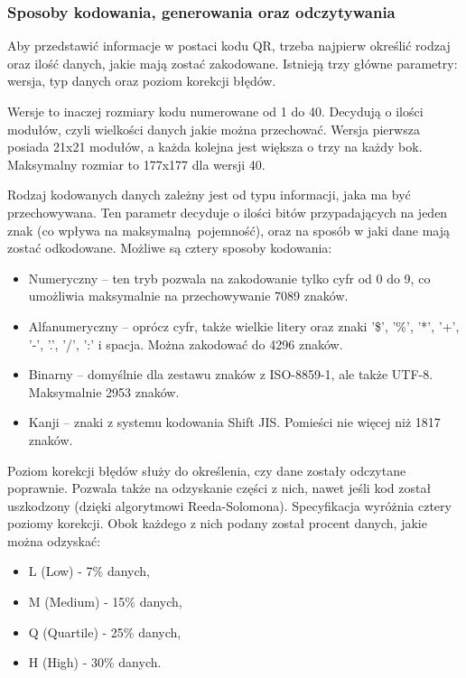 \subsubsection*{Sposoby kodowania, generowania oraz odczytywania}
Aby przedstawić informacje w postaci kodu QR, trzeba najpierw określić rodzaj oraz ilość danych, jakie mają zostać zakodowane. Istnieją trzy główne parametry: wersja, typ danych oraz poziom korekcji błędów.

Wersje to inaczej rozmiary kodu numerowane od 1 do 40. Decydują o ilości modułów, czyli wielkości danych jakie można przechować. Wersja pierwsza posiada 21x21 modułów, a każda kolejna jest większa o trzy na każdy bok. Maksymalny rozmiar to 177x177 dla wersji 40. 

Rodzaj kodowanych danych zależny jest od typu informacji, jaka ma być przechowywana. Ten parametr decyduje o ilości bitów przypadających na jeden znak (co wpływa na maksymalną pojemność), oraz na sposób w jaki dane mają zostać odkodowane. Możliwe są cztery sposoby kodowania:
\begin{itemize}
	\item Numeryczny -- ten tryb pozwala na zakodowanie tylko cyfr od 0 do 9, co umożliwia maksymalnie na przechowywanie 7089 znaków.
	\item Alfanumeryczny -- oprócz cyfr, także wielkie litery oraz znaki '\$', '\%', '*', '+', '-', '.', '/', ':' i spacja. Można zakodować do 4296 znaków. 
	\item Binarny -- domyślnie dla zestawu znaków z ISO-8859-1, ale także UTF-8. Maksymalnie 2953 znaków.
	\item Kanji -- znaki z systemu kodowania Shift JIS. Pomieści nie więcej niż 1817 znaków.
\end{itemize}

Poziom korekcji błędów służy do określenia, czy dane zostały odczytane poprawnie. Pozwala także na odzyskanie części z nich, nawet jeśli kod został uszkodzony (dzięki algorytmowi Reeda-Solomona). Specyfikacja wyróżnia cztery poziomy korekcji. Obok każdego z nich podany został procent danych, jakie można odzyskać:
\begin{itemize}
	\item L (Low) - 7\% danych,
	\item M (Medium) - 15\% danych,
	\item Q (Quartile) - 25\% danych,
	\item H (High) - 30\% danych.
\end{itemize}

